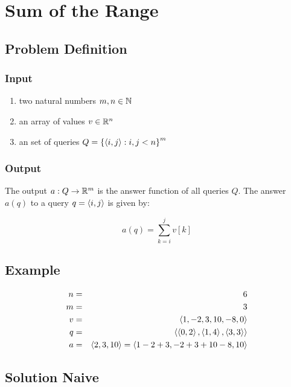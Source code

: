 \newcommand{\Sum}[3]{\displaystyle\sum\limits_{#1}^{#2} #3}

\chapter{Sum of the Range}

\section{Problem Definition}

\subsection{Input}

\begin{enumerate}
    \item two natural numbers $m, n \in \mathbb{N}$
    \item an array of values $v \in \mathbb{R}^n$
    \item an set of queries $Q = \left\{  \left\langle i, j \right\rangle : i, j < n \right\}^{m}$
\end{enumerate}

\subsection{Output}

The output $a: Q \rightarrow \mathbb{R}^m$ is the answer function of all queries $Q$. The answer $a(q)$ to a query $q = \left\langle i, j \right\rangle$ is given by:

\begin{equation}
    a(q) = \Sum{k=i}{j}{v[k]}
\end{equation}

\section{Example}

\begin{eqnarray}
    n & = & 6 \\
    m & = & 3 \\
    v & = & \left\langle 1, -2, 3, 10, -8, 0 \right\rangle \\
    q & = & \left\langle 
        \left\langle 0, 2 \right\rangle,
        \left\langle 1, 4 \right\rangle,
        \left\langle 3, 3 \right\rangle
     \right\rangle \\
    a & = & \left\langle 2, 3, 10 \right\rangle = \left\langle 1-2+3, -2+3+10-8, 10 \right\rangle
\end{eqnarray}

\section{Solution Naive}


